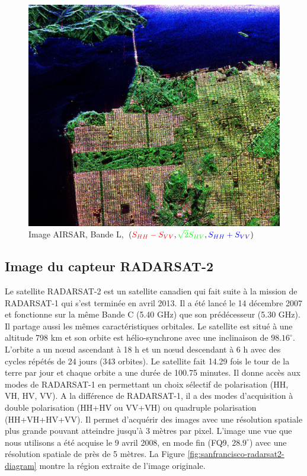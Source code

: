 \begin{figure}
  \includegraphics[width=1.0\linewidth]{figures/Chap4/AIRSAR-T3_RGB_reh.jpg}
  \centering
  \caption{
  \small{Image AIRSAR, Bande L, $(\textcolor{red}{S_{HH}-S_{VV}}, \textcolor{green}{\sqrt{2}S_{HV}}, \textcolor{blue}{S_{HH}+S_{VV}})$}
  }
  \label{fig:sanfrancisco-airsar-diagram}
\end{figure}

\subsection{Image du capteur RADARSAT-2}

Le satellite RADARSAT-2 est un satellite canadien qui fait suite à la mission de RADARSAT-1 qui s'est terminée en avril 2013. Il a été lancé le 14 décembre 2007 et fonctionne sur la même Bande C (5.40 GHz) que son prédécesseur (5.30 GHz).  Il partage aussi les mêmes caractéristiques orbitales.  Le satellite est situé à une altitude 798 km et son orbite est hélio-synchrone avec une inclinaison de $98.16^\circ$. L'orbite a un nœud ascendant à 18 h et un nœud descendant à 6 h avec des cycles répétés de 24 jours (343 orbites). Le satellite fait 14.29 fois le tour de la terre par jour et chaque orbite a une durée de 100.75 minutes. Il donne accès aux modes de RADARSAT-1 en permettant un choix sélectif de polarisation (HH, VH, HV, VV).  A la différence de RADARSAT-1, il a des modes d’acquisition à double polarisation (HH+HV ou VV+VH) ou quadruple polarisation (HH+VH+HV+VV).  Il permet d'acquérir des images avec une résolution spatiale plus grande pouvant atteindre jusqu’à 3 mètres par pixel.
L'image une vue que nous utilisons a été acquise le 9 avril 2008, en mode fin (FQ9, $28.9^{\circ}$) avec une résolution spatiale de près de 5 mètres.  La Figure \ref{fig:sanfrancisco-radarsat2-diagram} montre la région extraite de l'image originale.


